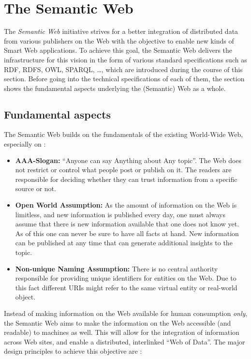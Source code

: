
\section{The Semantic Web}
\label{sec:semantic_web}

The \emph{Semantic Web} initiative strives for a better integration of distributed data from various publishers on the Web with the objective to enable new kinds of Smart Web applications. To achieve this goal, the Semantic Web delivers the infrastructure for this vision in the form of various standard specifications such as \gls{RDF}, \gls{RDFS}, \gls{OWL}, \gls{SPARQL}, \ldots, which are introduced during the course of this section. Before going into the technical specifications of each of them, the section shows the fundamental aspects underlying the (Semantic) Web as a whole.

\subsection{Fundamental aspects}
\label{subsec:fundamentals_semweb}

The Semantic Web builds on the fundamentals of the existing World-Wide Web, especially on \citep[pg. 4-11]{allemang2011semantic}: \@

\begin{itemize}
	\item \textbf{AAA-Slogan:} ``Anyone can say Anything about Any topic''. The Web does not restrict or control what people post or publish on it. The readers are responsible for deciding whether they can trust information from a specific source or not.
	\item \textbf{Open World Assumption:} As the amount of information on the Web is limitless, and new information is published every day, one must always assume that there is new information available that one does not know yet. As of this one can never be sure to have all facts at hand. New information can be published at any time that can generate additional insights to the topic.
	\item \textbf{Non-unique Naming Assumption:} There is no central authority responsible for providing unique identifiers for entities on the Web. Due to this fact different \gls{URI}s might refer to the same virtual entity or real-world object.
\end{itemize}

Instead of making information on the Web available for human consumption \emph{only}, the Semantic Web aims to make the information on the Web accessible (and readable) to machines as well. This will allow for the integration of information across Web sites, and enable a distributed, interlinked ``Web of Data''. The major design principles to achieve this objective are \citep[pg. 1-22]{antoniou2012semantic}: \@

